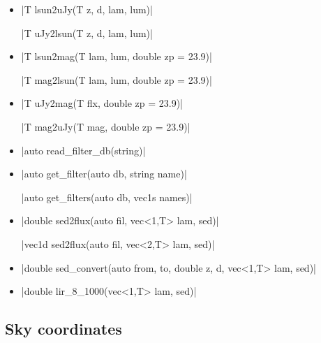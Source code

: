 \documentclass[12pt]{report}
\begin{document}
\begin{itemize}
\item \cppinline|T lsun2uJy(T z, d, lam, lum)| 

\cppinline|T uJy2lsun(T z, d, lam, lum)| 

\item \cppinline|T lsun2mag(T lam, lum, double zp = 23.9)| 

\cppinline|T mag2lsun(T lam, lum, double zp = 23.9)| 

\item \cppinline|T uJy2mag(T flx, double zp = 23.9)| 

\cppinline|T mag2uJy(T mag, double zp = 23.9)| 

\item \cppinline|auto read_filter_db(string)| 

\item \cppinline|auto get_filter(auto db, string name)| 

\cppinline|auto get_filters(auto db, vec1s names)| 

\item \cppinline|double sed2flux(auto fil, vec<1,T> lam, sed)| 

\cppinline|vec1d sed2flux(auto fil, vec<2,T> lam, sed)|

\item \cppinline|double sed_convert(auto from, to, double z, d, vec<1,T> lam, sed)| 

\item \cppinline|double lir_8_1000(vec<1,T> lam, sed)| 
\end{itemize}

\subsection{Sky coordinates}
\end{document}

